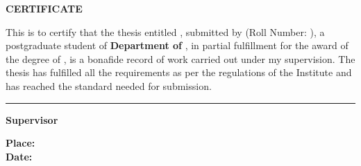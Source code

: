 \thispagestyle{plain}

\vspace{3\baselineskip}

\begin{center}
{\Large {\bf \uppercase{Certificate}}}
\end{center}

\vspace{\baselineskip}

\noindent This is to certify that the thesis entitled {\bf \mytitle}, submitted by {\bf \myname} (Roll Number: {\textit{\myrollno}}), a postgraduate student of {\bf Department of \mydep}, in partial fulfillment for the award of the degree of \mydegree, is a bonafide record of work carried out under my supervision. The thesis has fulfilled all the requirements as per the regulations of the Institute and has reached the standard needed for submission.

\vspace{3\baselineskip}
\begin{flushright}
\begin{minipage}[c]{0.45\textwidth}
\centering
\hrule 
\vspace{0.5\baselineskip}
{\Large \bf Supervisor} \\
\end{minipage}
\end{flushright}
\vspace{\baselineskip}

\noindent
{\large \bf Place: } \\
{\large \bf Date: }
